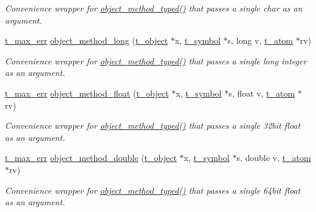 \begin{DoxyCompactItemize}
\begin{DoxyCompactList}\small\item\em Convenience wrapper for \hyperlink{group__obj_ga443dee482af22e0fe83e68955d367226}{object\_\-method\_\-typed()} that passes a single char as an argument. \item\end{DoxyCompactList}\item 
\hyperlink{group__datatypes_ga73edaae82b318855cc09fac994918165}{t\_\-max\_\-err} \hyperlink{group__obj_ga975e42fc3823dadc594232652291d26d}{object\_\-method\_\-long} (\hyperlink{structt__object}{t\_\-object} $\ast$x, \hyperlink{structt__symbol}{t\_\-symbol} $\ast$s, long v, \hyperlink{structt__atom}{t\_\-atom} $\ast$rv)
\begin{DoxyCompactList}\small\item\em Convenience wrapper for \hyperlink{group__obj_ga443dee482af22e0fe83e68955d367226}{object\_\-method\_\-typed()} that passes a single long integer as an argument. \item\end{DoxyCompactList}\item 
\hyperlink{group__datatypes_ga73edaae82b318855cc09fac994918165}{t\_\-max\_\-err} \hyperlink{group__obj_gabd57e5e8ce873c5aa12dfc60db6cb6f1}{object\_\-method\_\-float} (\hyperlink{structt__object}{t\_\-object} $\ast$x, \hyperlink{structt__symbol}{t\_\-symbol} $\ast$s, float v, \hyperlink{structt__atom}{t\_\-atom} $\ast$rv)
\begin{DoxyCompactList}\small\item\em Convenience wrapper for \hyperlink{group__obj_ga443dee482af22e0fe83e68955d367226}{object\_\-method\_\-typed()} that passes a single 32bit float as an argument. \item\end{DoxyCompactList}\item 
\hyperlink{group__datatypes_ga73edaae82b318855cc09fac994918165}{t\_\-max\_\-err} \hyperlink{group__obj_ga736ef8fbda2c79dd13a88f6ab81a9f9f}{object\_\-method\_\-double} (\hyperlink{structt__object}{t\_\-object} $\ast$x, \hyperlink{structt__symbol}{t\_\-symbol} $\ast$s, double v, \hyperlink{structt__atom}{t\_\-atom} $\ast$rv)
\begin{DoxyCompactList}\small\item\em Convenience wrapper for \hyperlink{group__obj_ga443dee482af22e0fe83e68955d367226}{object\_\-method\_\-typed()} that passes a single 64bit float as an argument. \item\end{DoxyCompactList}\item 

\end{DoxyCompactItemize}
